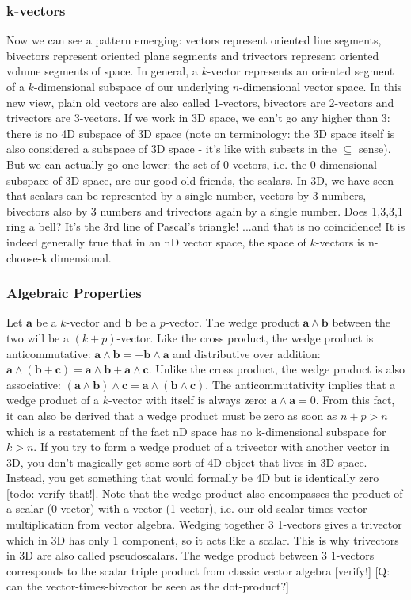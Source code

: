 \subsubsection{k-vectors}
Now we can see a pattern emerging: vectors represent oriented line segments, bivectors represent oriented plane segments and trivectors represent oriented volume segments of space. In general, a $k$-vector represents an oriented segment of a $k$-dimensional subspace of our underlying $n$-dimensional vector space. In this new view, plain old vectors are also called 1-vectors, bivectors are 2-vectors and trivectors are 3-vectors. If we work in 3D space, we can't go any higher than 3: there is no 4D subspace of 3D space (note on terminology: the 3D space itself is also considered a subspace of 3D space - it's like with subsets in the $\subseteq$ sense). But we can actually go one lower: the set of 0-vectors, i.e. the 0-dimensional subspace of 3D space, are our good old friends, the scalars. In 3D, we have seen that scalars can be represented by a single number, vectors by 3 numbers, bivectors also by 3 numbers and trivectors again by a single number. Does 1,3,3,1 ring a bell? It's the 3rd line of Pascal's triangle! ...and that is no coincidence! It is indeed generally true that in an nD vector space, the space of $k$-vectors is n-choose-k dimensional.

\subsubsection{Algebraic Properties}
Let $\mathbf{a}$ be a $k$-vector and $\mathbf{b}$ be a $p$-vector. The wedge product $\mathbf{a \wedge b}$ between the two will be a $(k+p)$-vector. Like the cross product, the wedge product is anticommutative: $\mathbf{a \wedge b} = -\mathbf{b \wedge a}$ and distributive over addition: $\mathbf{a \wedge (b + c) = a \wedge b + a \wedge c }$. Unlike the cross product, the wedge product is also associative: $\mathbf{(a \wedge b) \wedge c = a \wedge (b \wedge c)}$. The anticommutativity implies that a wedge product of a $k$-vector with itself is always zero: $\mathbf{a \wedge a} = 0$. From this fact, it can also be derived that a wedge product must be zero as soon as $n+p > n$ which is a restatement of the fact nD space has no k-dimensional subspace for $k>n$. If you try to form a wedge product of a trivector with another vector in 3D, you don't magically get some sort of 4D object that lives in 3D space. Instead, you get something that would formally be 4D but is identically zero [todo: verify that!]. Note that the wedge product also encompasses the product of a scalar (0-vector) with a vector (1-vector), i.e. our old scalar-times-vector multiplication from vector algebra. Wedging together 3 1-vectors gives a trivector which in 3D has only 1 component, so it acts like a scalar. This is why trivectors in 3D are also called pseudoscalars. The wedge product between 3 1-vectors corresponds to the scalar triple product from classic vector algebra [verify!] [Q: can the vector-times-bivector be seen as the dot-product?]

